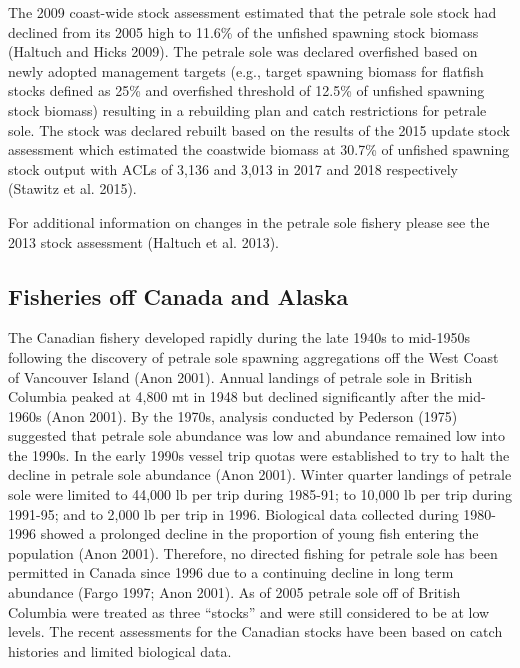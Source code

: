 \documentclass[11pt,
  english,
  letterpaper,
]{article}
\begin{document}
The 2009 coast-wide stock assessment estimated that the petrale sole stock had declined from its 2005 high to 11.6\% of the unfished spawning stock biomass (Haltuch and Hicks 2009). The petrale sole was declared overfished based on newly adopted management targets (e.g., target spawning biomass for flatfish stocks defined as 25\% and overfished threshold of 12.5\% of unfished spawning stock biomass) resulting in a rebuilding plan and catch restrictions for petrale sole. The stock was declared rebuilt based on the results of the 2015 update stock assessment which estimated the coastwide biomass at 30.7\% of unfished spawning stock output with ACLs of 3,136 and 3,013 in 2017 and 2018 respectively (Stawitz et al. 2015).

For additional information on changes in the petrale sole fishery please see the 2013 stock assessment (Haltuch et al. 2013).

\hypertarget{fisheries-off-canada-and-alaska}{%
\subsection{Fisheries off Canada and Alaska}\label{fisheries-off-canada-and-alaska}}

The Canadian fishery developed rapidly during the late 1940s to mid-1950s following the discovery of petrale sole spawning aggregations off the West Coast of Vancouver Island (Anon 2001). Annual landings of petrale sole in British Columbia peaked at 4,800 mt in 1948 but declined significantly after the mid-1960s (Anon 2001). By the 1970s, analysis conducted by Pederson (1975) suggested that petrale sole abundance was low and abundance remained low into the 1990s. In the early 1990s vessel trip quotas were established to try to halt the decline in petrale sole abundance (Anon 2001). Winter quarter landings of petrale sole were limited to 44,000 lb per trip during 1985-91; to 10,000 lb per trip during 1991-95; and to 2,000 lb per trip in 1996. Biological data collected during 1980-1996 showed a prolonged decline in the proportion of young fish entering the population (Anon 2001). Therefore, no directed fishing for petrale sole has been permitted in Canada since 1996 due to a continuing decline in long term abundance (Fargo 1997; Anon 2001). As of 2005 petrale sole off of British Columbia were treated as three ``stocks'' and were still considered to be at low levels. The recent assessments for the Canadian stocks have been based on catch histories and limited biological data.
\end{document}
